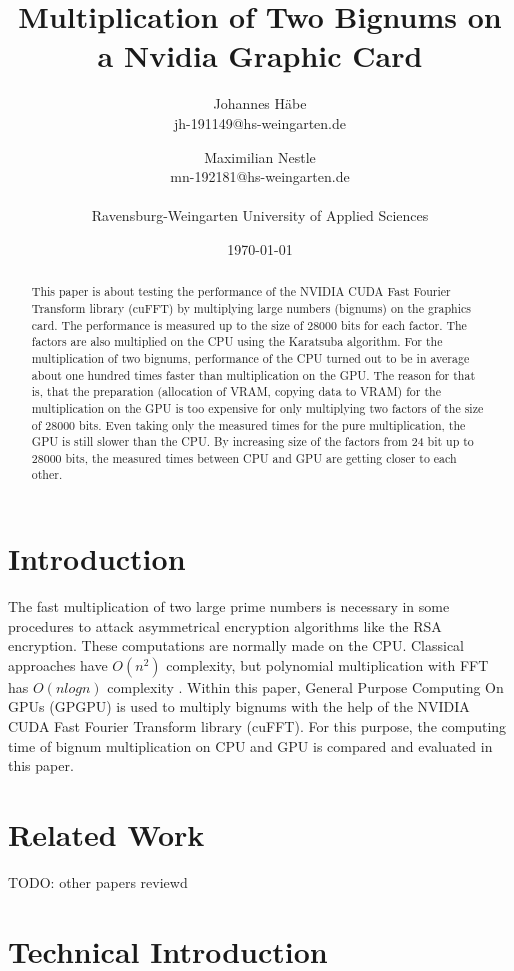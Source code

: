 \documentclass[12pt,a4paper]{article}
\title{Multiplication of Two Bignums on a Nvidia Graphic Card}
\author{Johannes H\"abe  \\
	jh-191149@hs-weingarten.de
	\and 
	Maximilian Nestle \\
	mn-192181@hs-weingarten.de \\\\
	Ravensburg-Weingarten University of Applied Sciences
	}
\date{\today}
\begin{document}
\maketitle
%
\begin{abstract}
This paper is about testing the performance of the NVIDIA CUDA Fast Fourier Transform library (cuFFT) by multiplying large numbers (bignums) on the graphics card. The performance is measured up to the size of 28000 bits for each factor. The factors are also multiplied on the CPU using the Karatsuba algorithm. For the multiplication of two bignums, performance of the CPU turned out to be in average about one hundred times faster than multiplication on the GPU. The reason for that is, that the preparation (allocation of VRAM, copying data to VRAM) for the multiplication on the GPU is too expensive for only multiplying two factors of the size of 28000 bits. Even taking only the measured times for the pure multiplication, the GPU is still slower than the CPU. By increasing size of the factors from 24 bit up to 28000 bits, the measured times between CPU and GPU are getting closer to each other.
\end{abstract}

\section{Introduction}
The fast multiplication of two large prime numbers is necessary in some procedures to attack asymmetrical encryption algorithms like the RSA encryption. These computations are normally made on the CPU. Classical approaches have $O(n^2)$ complexity, but polynomial multiplication with FFT has $O(nlogn)$ complexity \cite{bantikyan2014big}. Within this paper, General Purpose Computing On GPUs (GPGPU) is used to multiply bignums with the help of the NVIDIA CUDA Fast Fourier Transform library (cuFFT). For this purpose, the computing time of bignum multiplication on CPU and GPU is compared and evaluated in this paper.

\section{Related Work}
TODO: other papers reviewd

\section{Technical Introduction}
\end{document}
